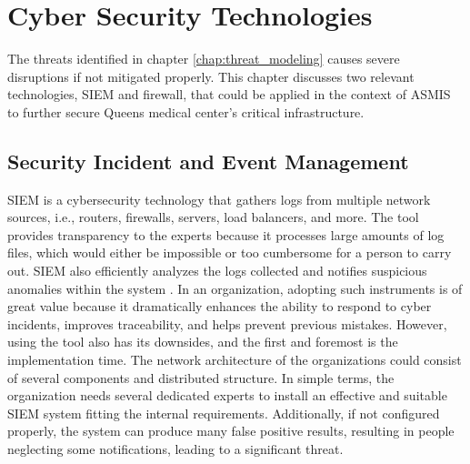 \chapter{Cyber Security Technologies}
The threats identified in chapter \ref{chap:threat_modeling} causes severe disruptions if not mitigated properly. This chapter discusses two relevant technologies, SIEM and firewall, that could be applied in the context of ASMIS to further secure Queens medical center's critical infrastructure.

\section{Security Incident and Event Management}
SIEM is a cybersecurity technology that gathers logs from multiple network sources, i.e., routers, firewalls, servers, load balancers, and more. The tool provides transparency to the experts because it processes large amounts of log files, which would either be impossible or too cumbersome for a person to carry out. SIEM also efficiently analyzes the logs collected and notifies suspicious anomalies within the system \citep[p.~1]{SIEM}. In an organization, adopting such instruments is of great value because it dramatically enhances the ability to respond to cyber incidents, improves traceability, and helps prevent previous mistakes. \newline\newline 
However, using the tool also has its downsides, and the first and foremost is the implementation time. The network architecture of the organizations could consist of several components and distributed structure. In simple terms, the organization needs several dedicated experts to install an effective and suitable SIEM system fitting the internal requirements. Additionally, if not configured properly, the system can produce many false positive results, resulting in people neglecting some notifications, leading to a significant threat.

